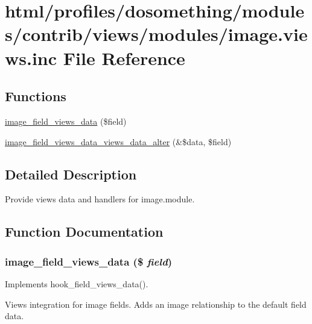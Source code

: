 \hypertarget{image_8views_8inc}{
\section{html/profiles/dosomething/modules/contrib/views/modules/image.views.inc File Reference}
\label{image_8views_8inc}
}
\subsection*{Functions}
\begin{DoxyCompactItemize}
\item 
\hyperlink{image_8views_8inc_a16056953cf5eff02d472cd7dd3d802e1}{image\_\-field\_\-views\_\-data} (\$field)
\item 
\hyperlink{image_8views_8inc_a6a573e59d074618f557734255bd235b8}{image\_\-field\_\-views\_\-data\_\-views\_\-data\_\-alter} (\&\$data, \$field)
\end{DoxyCompactItemize}


\subsection{Detailed Description}
Provide views data and handlers for image.module. 

\subsection{Function Documentation}
\hypertarget{image_8views_8inc_a16056953cf5eff02d472cd7dd3d802e1}{
\subsubsection[{image\_\-field\_\-views\_\-data}]{\setlength{\rightskip}{0pt plus 5cm}image\_\-field\_\-views\_\-data (\$ {\em field})}}
\label{image_8views_8inc_a16056953cf5eff02d472cd7dd3d802e1}
Implements hook\_\-field\_\-views\_\-data().

Views integration for image fields. Adds an image relationship to the default field data.

